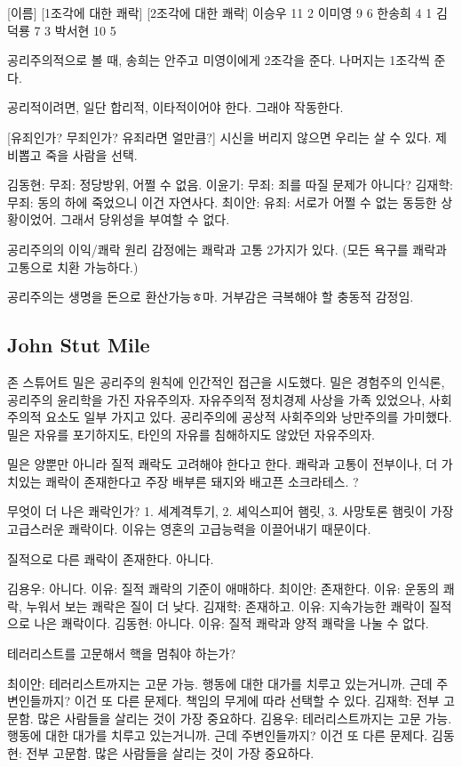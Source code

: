 [이름] [1조각에 대한 쾌락] [2조각에 대한 쾌락]
이승우 11 2
이미영 9 6
한송희 4 1
김덕룡 7 3
박서현 10 5

공리주의적으로 볼 때, 송희는 안주고 미영이에게 2조각을 준다. 나머지는 1조각씩 준다.

공리적이려면, 일단 합리적, 이타적이어야 한다. 그래야 작동한다.

[유죄인가? 무죄인가? 유죄라면 얼만큼?]
시신을 버리지 않으면 우리는 살 수 있다.
제비뽑고 죽을 사람을 선택.

김동현: 무죄: 정당방위, 어쩔 수 없음.
이윤기: 무죄: 죄를 따질 문제가 아니다?
김재학: 무죄: 동의 하에 죽었으니 이건 자연사다.
최이안: 유죄: 서로가 어쩔 수 없는 동등한 상황이었어. 그래서 당위성을 부여할 수 없다.

공리주의의 이익/쾌락 원리
감정에는 쾌락과 고통 2가지가 있다. (모든 욕구를 쾌락과 고통으로 치환 가능하다.)

공리주의는 생명을 돈으로 환산가능ㅎ마. 거부감은 극복해야 할 충동적 감정임.

\subsection{John Stut Mile}

존 스튜어트 밀은 공리주의 원칙에 인간적인 접근을 시도했다. 밀은 경험주의 인식론,
공리주의 윤리학을 가진 자유주의자. 자유주의적 정치경제 사상을 가족 있었으나,
사회주의적 요소도 일부 가지고 있다. 공리주의에 공상적 사회주의와 낭만주의를 가미했다.
밀은 자유를 포기하지도, 타인의 자유를 침해하지도 않았던 자유주의자.

밀은 양뿐만 아니라 질적 쾌락도 고려해야 한다고 한다. 쾌락과 고통이 전부이나, 더 가치있는 쾌락이 존재한다고 주장
배부른 돼지와 배고픈 소크라테스. ?

무엇이 더 나은 쾌락인가? 1. 세계격투기, 2. 셰익스피어 햄릿, 3. 사망토론
햄릿이 가장 고급스러운 쾌락이다. 이유는 영혼의 고급능력을 이끌어내기 때문이다.

질적으로 다른 쾌락이 존재한다. 아니다.

김용우: 아니다. 이유: 질적 쾌락의 기준이 애매하다.
최이안: 존재한다. 이유: 운동의 쾌락, 누워서 보는 쾌락은 질이 더 낮다.
김재학: 존재하고. 이유: 지속가능한 쾌락이 질적으로 나은 쾌락이다.
김동현: 아니다. 이유: 질적 쾌락과 양적 쾌락을 나눌 수 없다.

테러리스트를 고문해서 핵을 멈춰야 하는가?

최이안: 테러리스트까지는 고문 가능. 행동에 대한 대가를 치루고 있는거니까. 근데
주변인들까지? 이건 또 다른 문제다. 책임의 무게에 따라 선택할 수 있다.
김재학: 전부 고문함. 많은 사람들을 살리는 것이 가장 중요하다.
김용우: 테러리스트까지는 고문 가능. 행동에 대한 대가를 치루고 있는거니까. 근데
주변인들까지? 이건 또 다른 문제다.
김동현: 전부 고문함. 많은 사람들을 살리는 것이 가장 중요하다.

